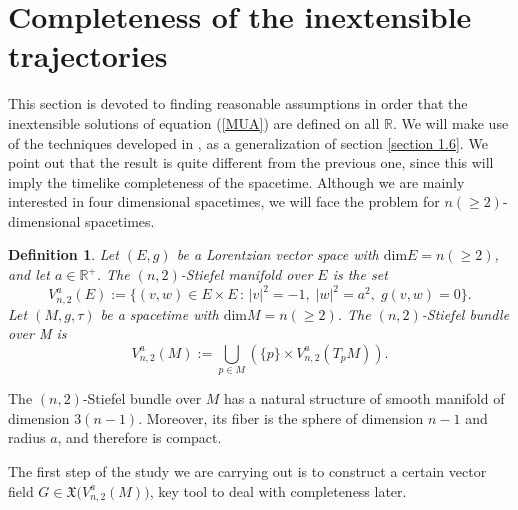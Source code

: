 \documentclass[11pt]{book}
\newtheorem{defi}{Definition}[chapter]
\def\R{\mathbb R}
\begin{document}
\section{Completeness of the inextensible trajectories}
This section is devoted to finding reasonable assumptions in order that the inextensible solutions of equation (\ref{MUA}) are defined on all $\R$. We will make use of the techniques developed in \cite{UAM}, as a generalization of section \ref{section 1.6}. We point out that the result is quite different from the previous one, since this will imply the timelike completeness of the spacetime. Although we are mainly interested in four dimensional spacetimes, we will face the problem for $n(\geq 2)$-dimensional spacetimes.  

\begin{defi}
	Let $(E,g)$ be a Lorentzian vector space with $\text{dim}E=n(\ge 2)$, and let $a\in \R^+$. The $(n,2)$-Stiefel manifold over $E$ is the set
	\[
	V_{n,2}^a(E):= \big\{(v,w)\in E\times E \, : \, |v|^2=-1,\; |w|^2=a^2,\; g(v,w)=0\big\}.
	\]
	Let $(M,g,\tau)$ be a spacetime with $\text{dim}M=n(\ge 2)$. The $(n,2)$-Stiefel bundle over M is
	\[
	V_{n,2}^a(M):=\bigcup_{p\in M} \left(\{p\}\times V_{n,2}^a(T_pM)\right).
	\]
\end{defi}
The $(n,2)$-Stiefel bundle over $M$ has a natural structure of smooth manifold of dimension $3(n-1)$. Moreover, its fiber is the sphere of dimension $n-1$ and radius $a$, and therefore is compact.

\vspace{2mm}

The first step of the study we are carrying out is to construct a certain vector field $G\in \mathfrak{X}\big(V_{n,2}^a(M)\big)$, key tool to deal with completeness later. 
\end{document}
